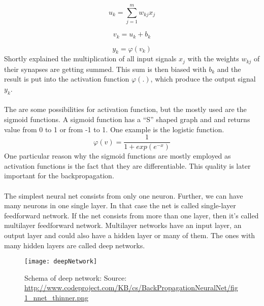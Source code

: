 \documentclass[runningheads,a4paper]{llncs}[2015/06/24]
\begin{document}
\begin{equation}
u_k = \sum_{j=1}^{m} w_{kj}x_j
\end{equation}

\begin{equation}
v_k = u_k + b_k
\end{equation}

\begin{equation}
y_k = φ(v_k)
\end{equation}Shortly explained the multiplication of all input signals $x_j$ with the weights $w_{kj}$ of their synapses are getting summed. This sum is then biased with $b_k$ and the result is put into the activation function $φ(.)$, which produce the output signal $y_k$.\\\\
The are some possibilities for activation function, but the mostly used are the sigmoid functions. A sigmoid function has a \enquote{S} shaped graph and and returns value from 0 to 1 or from -1 to 1. One example is the logistic function.
\begin{equation}
φ(v) = \frac{1}{1 + exp(e^{-x})}
\end{equation}
One particular reason why the sigmoid functions are mostly employed as activation functions is the fact that they are differentiable. This quality is later important for the backpropagation. \\\\The simplest neural net consists from only one neuron. Further, we can have many neurons in one single layer. In that  case the net is called single-layer feedforward network. If the net consists from more than one layer, then it's called multilayer feedforward network. Multilayer networks have an input layer, an output layer and could also have a hidden layer or many of them. The ones with many hidden layers are called deep networks\cite{haykin2009neural}.

\begin{figure}[h]
\centering
\texttt{[image: deepNetwork]}
\caption{Schema of deep network: Source: \url{http://www.codeproject.com/KB/cs/BackPropagationNeuralNet/fig1_nnet_thinner.png}}
\label{fig:deepNetwork}
\end{figure}  
  
\end{document}
